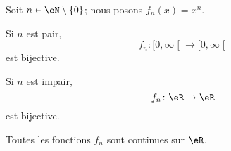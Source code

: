 \begin{proposition}     \label{PROPooXQYFooPxoEHE}
    Soit \( n\in \eN\setminus\{ 0 \}\); nous posons \( f_n(x)=x^n\).

    Si \( n\) est pair,
    \begin{equation}
        f_n\colon \mathopen[ 0 , \infty \mathclose[\to \mathopen[ 0 , \infty \mathclose[
    \end{equation}
    est bijective.

    Si \( n\) est impair,
    \begin{equation}
        f_n\colon \eR \to \eR
    \end{equation}
    est bijective.

    Toutes les fonctions \( f_n\) sont continues sur \( \eR\).
\end{proposition}

